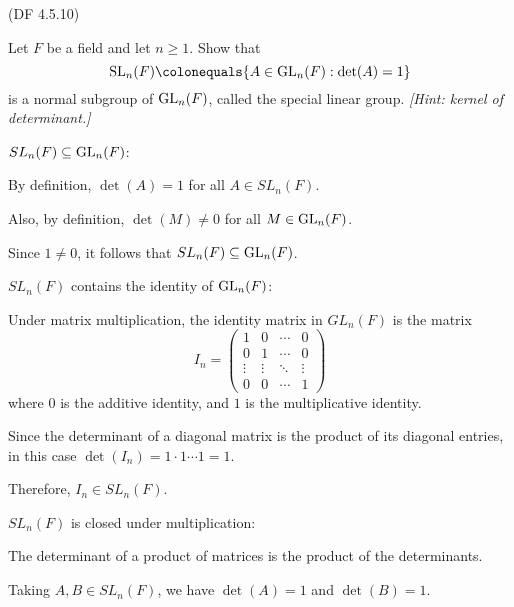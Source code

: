 \begin{problem}{(\textsf{DF 4.5.10})}
  \begin{enumalph}
    \item Let $F$ be a field and let $n \geq 1$.
      Show that \[ \SL_n(F) \colonequals \{A \in \GL_n(F) : \det(A)=1\} \]
      is a normal subgroup of $\mathrm{GL}_n(F)$, called the \textsf{special linear group}.
      \emph{[Hint: kernel of determinant.]}

      \begin{Answer}
        \begin{enumalph}
          \item $SL_n(F) \subseteq \mathrm{GL}_n(F)$:
            
            \noindent
            By definition, $\det(A)=1$ for all $A \in SL_n(F)$.

            \noindent
            Also, by definition, $\det(M) \neq 0$ for all $M \in \mathrm{GL}_n(F)$.

            \noindent
            Since $1 \neq 0$, it follows that $SL_n(F) \subseteq \mathrm{GL}_n(F)$.
          \item $SL_n(F)$ contains the identity of $\mathrm{GL}_n(F)$:
          
            \noindent
            Under matrix multiplication, the identity matrix
            in $GL_n(F)$ is the matrix
            \[I_n = \begin{pmatrix}
              1 & 0 & \cdots & 0 \\
              0 & 1 & \cdots & 0 \\
              \vdots & \vdots & \ddots & \vdots \\
              0 & 0 & \cdots & 1
            \end{pmatrix}\]
            where $0$ is the additive identity, and $1$ is the multiplicative identity.

            \noindent
            Since the determinant of a diagonal matrix is the product of its diagonal entries,
            in this case $\det(I_n) = 1 \cdot 1 \cdots 1 = 1$.

            \noindent
            Therefore, $I_n \in SL_n(F)$.
          \item $SL_n(F)$ is closed under multiplication:
          
            \noindent
            The determinant of a product of matrices is the product of the determinants.

            \noindent
            Taking $A,B \in SL_n(F)$, we have $\det(A) = 1$ and $\det(B) = 1$.


\end{enumalph}
\end{Answer}
\end{enumalph}
\end{problem}

